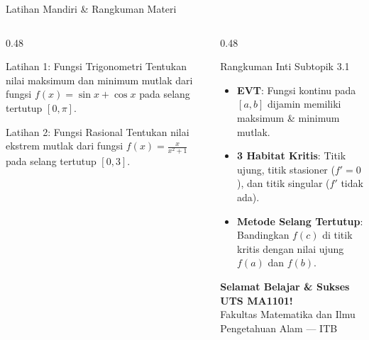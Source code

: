 \documentclass[aspectratio=169,10pt]{beamer}
\begin{document}
\begin{frame}{Latihan Mandiri \& Rangkuman Materi}
    \begin{columns}[T]
        \begin{column}{0.48\textwidth}
            \begin{block}{Latihan 1: Fungsi Trigonometri}
                Tentukan nilai maksimum dan minimum mutlak dari fungsi $f(x) = \sin x + \cos x$ pada selang tertutup $[0, \pi]$.
            \end{block}

            \begin{block}{Latihan 2: Fungsi Rasional}
                Tentukan nilai ekstrem mutlak dari fungsi $f(x) = \frac{x}{x^2 + 1}$ pada selang tertutup $[0, 3]$.
            \end{block}
        \end{column}

        \begin{column}{0.48\textwidth}
            \begin{alertblock}{Rangkuman Inti Subtopik 3.1}
                \begin{itemize}
                    \item \textbf{EVT}: Fungsi kontinu pada $[a, b]$ dijamin memiliki maksimum \& minimum mutlak.
                    \item \textbf{3 Habitat Kritis}: Titik ujung, titik stasioner ($f'=0$), dan titik singular ($f'$ tidak ada).
                    \item \textbf{Metode Selang Tertutup}: Bandingkan $f(c)$ di titik kritis dengan nilai ujung $f(a)$ dan $f(b)$.
                \end{itemize}
            \end{alertblock}

            \vspace{0.15cm}
            \centering
            {\small \textbf{Selamat Belajar \& Sukses UTS MA1101!}}\\
            {\scriptsize \color{SoftGray} Fakultas Matematika dan Ilmu Pengetahuan Alam --- ITB}
        \end{column}
    \end{columns}
\end{frame}
\end{document}
